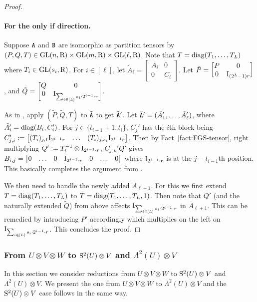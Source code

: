\begin{proof}
\paragraph{For the only if direction.} Suppose $\tA$ and $\tB$ are isomorphic as partition tensors by $(P, Q, T)\in\GL(n, \rng)\times\GL(m, \rng)\times\GL(\ell, \rng)$. Note that $T=\diag(T_1, \dots, T_L)$ where $T_i\in\GL(s_i, \rng)$. For $i\in[\ell]$, let $\tilde A_i=\begin{bmatrix}
	A_i & 0 \\
	0 & C_i
\end{bmatrix}$. Let $\tilde P=\begin{bmatrix}
P & 0 \\
0 & \idmat_{(2^L-1)r}
\end{bmatrix}$, and $\tilde Q=\begin{bmatrix}
Q & 0 \\
0 & \idmat_{\sum_{i\in[L]}s_i\cdot 2^{i-1}\cdot r}\end{bmatrix}$.


As in \cite{FGS19}, apply $(\tilde P, \tilde Q, T)$ to $\tilde \tA$ to get $\tilde \tA'$. Let $\tilde\tA'=(\tilde A_1', \dots, \tilde A_\ell')$, where $\tilde A_i'=\diag(B_i, C_i')$. For $j\in\{t_{i-1}+1, t_i\}$, $C_j'$ has the $i$th block being $C_{j,i}':=\begin{bmatrix}
	(T_i)_{j, 1} \idmat_{2^{i-1}r} & \dots & (T_i)_{j, s_i} \idmat_{2^{i-1}r}
\end{bmatrix}$. Then by Fact~\ref{fact:FGS-tensor}, right multiplying $Q':=T_i^{-1}\otimes \idmat_{2^{i-1}\cdot r}$, $C_{j,k}'Q'$ gives $B_{i,j}=\begin{bmatrix}
	0 & \dots & 0 & \idmat_{2^{i-1}\cdot r}& 0 & \dots & 0
\end{bmatrix}$ where $\idmat_{2^{i-1}\cdot r}$ is at the $j-t_{i-1}$th position. This basically completes the argument from \cite{FGS19}.

We then need to handle the newly added $\bar A_{\ell+1}$. For this we first extend $T=\diag(T_1, \dots, T_L)$ to $\bar T=\diag(T_1, \dots, T_L, 1)$. Then note that $Q'$ (and the naturally extended $\tilde Q$) from above affects $\idmat_{\sum_{i\in[L]}s_i\cdot 2^{i-1}\cdot r}$ in $\bar A_{\ell+1}$. This can be remedied by introducing $P'$ accordingly which multiplies on the left on $\idmat_{\sum_{i\in[L]}s_i\cdot 2^{i-1}\cdot r}$. This concludes the proof.
\end{proof}


\subsubsection{From $U\otimes V\otimes W$ to $\S^2(U)\otimes V$ and $\Lambda^2(U)\otimes V$}\label{subsec:S2UW}
In this section we consider reductions from $U\otimes V\otimes W$ to $\S^2(U)\otimes V$ and $\Lambda^2(U)\otimes V$. We present the one from $U\otimes V\otimes W$ to $\Lambda^2(U)\otimes V$ and the $\S^2(U)\otimes V$ case follows in the same way. 

